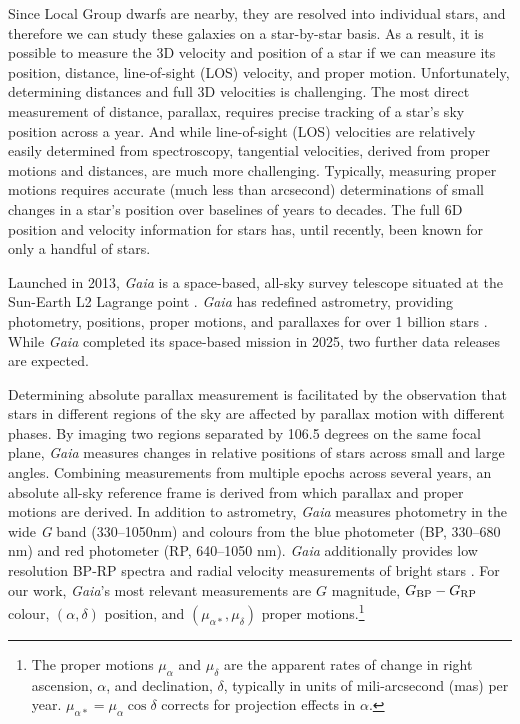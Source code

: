 Since Local Group dwarfs are nearby, they are resolved into individual
stars, and therefore we can study these galaxies on a star-by-star
basis. As a result, it is possible to measure the 3D velocity and
position of a star if we can measure its position, distance,
line-of-sight (LOS) velocity, and proper motion. Unfortunately,
determining distances and full 3D velocities is challenging. The most
direct measurement of distance, parallax, requires precise tracking of a
star's sky position across a year. And while line-of-sight (LOS)
velocities are relatively easily determined from spectroscopy,
tangential velocities, derived from proper motions and distances, are
much more challenging. Typically, measuring proper motions requires
accurate (much less than arcsecond) determinations of small changes in a
star's position over baselines of years to decades. The full 6D position
and velocity information for stars has, until recently, been known for
only a handful of stars.

Launched in 2013, \emph{Gaia} is a space-based, all-sky survey telescope
situated at the Sun-Earth L2 Lagrange point
\citep{gaiacollaboration+2016}. \emph{Gaia} has redefined astrometry,
providing photometry, positions, proper motions, and parallaxes for over
1 billion stars \citep{gaiacollaboration+2021}. While \emph{Gaia}
completed its space-based mission in 2025, two further data releases are
expected.

Determining absolute parallax measurement is facilitated by the
observation that stars in different regions of the sky are affected by
parallax motion with different phases. By imaging two regions separated
by 106.5 degrees on the same focal plane, \emph{Gaia} measures changes
in relative positions of stars across small and large angles. Combining
measurements from multiple epochs across several years, an absolute
all-sky reference frame is derived from which parallax and proper
motions are derived. In addition to astrometry, \emph{Gaia} measures
photometry in the wide \emph{G} band (330--1050nm) and colours from the
blue photometer (BP, 330--680 nm) and red photometer (RP, 640--1050 nm).
\emph{Gaia} additionally provides low resolution BP-RP spectra and
radial velocity measurements of bright stars \citep[of magnitudes
\(G_{\rm RVS} < 16\),][]{gaiacollaboration+2016}. For our work,
\emph{Gaia}'s most relevant measurements are \(G\) magnitude,
\(G_{\rm BP} - G_{\rm RP}\) colour, \((\alpha, \delta)\) position, and
\((\mu_{\alpha*}, \mu_\delta)\) proper motions.\footnote{The proper
  motions \(\mu_\alpha\) and \(\mu_\delta\) are the apparent rates of
  change in right ascension, \(\alpha\), and declination, \(\delta\),
  typically in units of mili-arcsecond (mas) per year.
  \(\mu_{\alpha*} = \mu_\alpha \cos \delta\) corrects for projection
  effects in \(\alpha\).}

